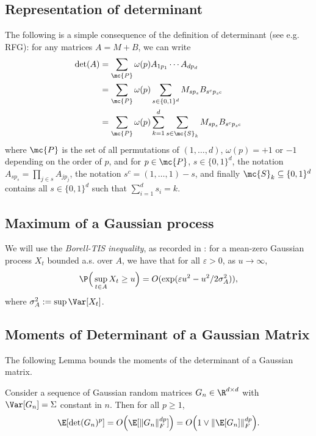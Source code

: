 \documentclass{article}
\newcommand{\ag}[1]{{\bf{{\red{[{AG: #1}]}}}}}
\begin{document}
	\subsection{Representation of determinant}
	The following is a simple consequence of the definition of determinant (see e.g. RFG): for any matrices $A = M + B$, we can write
	\begin{equation}
		\label{eqn:representation-determinant}
		\begin{aligned}
			\det(A) 
			& = \sum_{\mc{P}} \omega(p) A_{1p_1} \cdots A_{dp_d} \\
			& = \sum_{\mc{P}} \omega(p) \sum_{s \in \{0,1\}^d} M_{sp_s} B_{s^cp_{s^c}} \\
			& = \sum_{\mc{P}} \omega(p) \sum_{k = 1}^{d} \sum_{s \in \mc{S}_k} M_{sp_s} B_{s^cp_{s^c}}
		\end{aligned}
	\end{equation}
	where $\mc{P}$ is the set of all permutations of $(1,\ldots,d)$, $\omega(p) = +1$ or $-1$ depending on the order of $p$, and for $p \in \mc{P}$, $s \in \{0,1\}^d$, the notation $A_{sp_s} = \prod_{j \in s} A_{jp_j}$, the notation $s^c = (1,\ldots,1) - s$, and finally $\mc{S}_k \subseteq \{0,1\}^d$ contains all $s \in \{0,1\}^d$ such that $\sum_{i = 1}^{d} s_i = k$.
	
	\subsection{Maximum of a Gaussian process}
	We will use the \emph{Borell-TIS inequality}, as recorded in : for a mean-zero Gaussian process $X_t$ bounded a.s. over $A$, we have that for all $\varepsilon > 0$, as $u \to \infty$,
	\begin{equation}
		\label{eqn:borell-tis}
		\P\Big(\sup_{t \in A} X_t \geq u\Big) = O(\exp(\varepsilon u^2 - u^2/2\sigma_{A}^2)), 
	\end{equation}
	where $\sigma_{A}^2 := \sup \Var[X_t]$.  
	
	\subsection{Moments of Determinant of a Gaussian Matrix}
	The following Lemma bounds the moments of the determinant of a Gaussian matrix. \ag{Needs a proof.}
	\begin{lemma}
		\label{lem:determinant-moments}
		Consider a sequence of Gaussian random matrices $G_n \in \R^{d \times d}$ with $\Var[G_n] = \Sigma$ constant in $n$. Then for all $p \geq 1$,
		\begin{equation*}
			\E[\det(G_n)^{p}] = O\Big(\E[\|G_n\|_F^{dp}]\Big) = O\Big(1 \vee \|\E[G_n]\|_{F}^{dp}\Big).
		\end{equation*} 
	\end{lemma}
	
\end{document}
